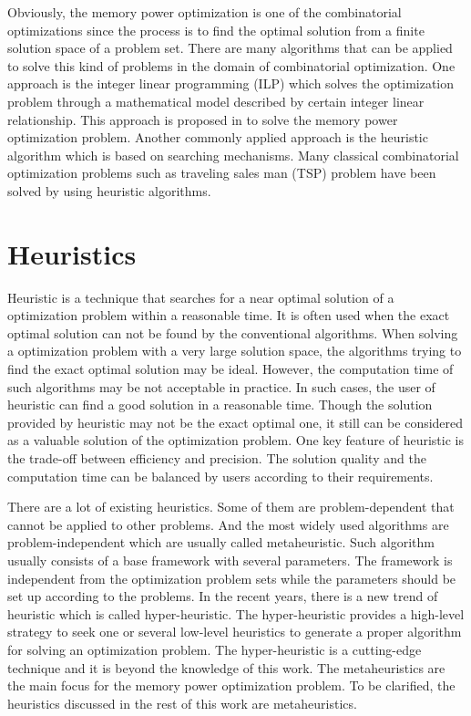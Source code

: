 	Obviously, the memory power optimization is one of the combinatorial optimizations since the process
	is to find the optimal solution from a finite solution space of a problem set. There are many algorithms
	that can be applied to solve this kind of problems in the domain of combinatorial optimization.
	One approach is the integer linear programming (ILP) which solves the optimization problem through a 
	mathematical model described by certain integer linear relationship. This approach is proposed in
	\cite{Strobel2016} to solve the memory power optimization problem. Another commonly applied approach is the
	heuristic algorithm which is based on searching mechanisms. Many classical combinatorial optimization
	problems such as traveling sales man (TSP) problem have been solved by using heuristic algorithms.
	
	\section{Heuristics}
	\label{sec:heuristics}
	Heuristic is a technique that searches for a near optimal solution of a optimization problem within
	a reasonable time. It is often used when the exact optimal solution can not be found by the conventional
	algorithms. When solving a optimization problem with a very large solution space, the algorithms trying to
	find the exact optimal solution may be ideal. However, the computation time of such algorithms may be not
	acceptable in practice. In such cases, the user of heuristic can find a good solution in a reasonable
	time. Though the solution provided by heuristic may not be the exact optimal one, it still can be
	considered as a valuable solution of the optimization problem. One key feature of heuristic is the
	trade-off between efficiency and precision. The solution quality and the computation time can be balanced by
	users according to their requirements.
	
	There are a lot of existing heuristics. Some of them are problem-dependent that cannot be applied to other
	problems. And the most widely used algorithms are problem-independent which are usually called metaheuristic.
	Such algorithm usually consists of a base framework with several parameters. The framework is independent from
	the optimization problem sets while the parameters should be set up according to the problems.
	In the recent years, there is a new trend of heuristic which is called hyper-heuristic. The hyper-heuristic
	provides a high-level strategy to seek one or several low-level heuristics to generate a proper algorithm for
	solving an optimization problem. The hyper-heuristic is a cutting-edge technique and it is beyond the knowledge of
	this work. The metaheuristics are the main focus for the memory power optimization problem. To be clarified, 
	the heuristics discussed in the rest of this work are metaheuristics.
	
